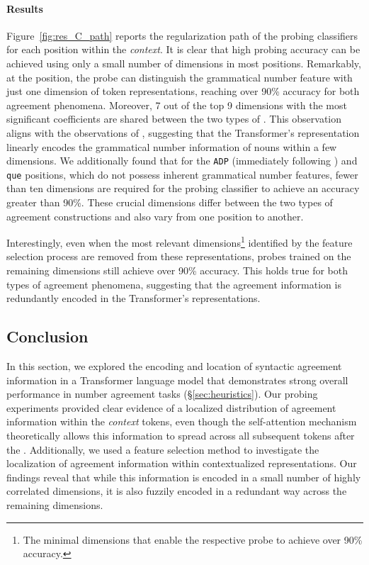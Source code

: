 \paragraph{Results} Figure~\ref{fig:res_C_path} reports the regularization path of the probing classifiers for each position within the \emph{context}. It is clear that high probing accuracy can be achieved using only a small number of dimensions in most positions. Remarkably, at the \cue position, the probe can distinguish the grammatical number feature with just one dimension of token representations, reaching over 90\% accuracy for both agreement phenomena. Moreover, 7 out of the top 9 dimensions with the most significant coefficients are shared between the two types of \cue. This observation aligns with the observations of \citep{amini2023naturalistic}, suggesting that the Transformer's representation linearly encodes the grammatical number information of nouns within a few dimensions. We additionally found that for the \texttt{ADP} (immediately following \cue) and \texttt{que} positions, which do not possess inherent grammatical number features, fewer than ten dimensions are required for the probing classifier to achieve an accuracy greater than 90\%. These crucial dimensions differ between the two types of agreement constructions and also vary from one position to another.

Interestingly, even when the most relevant dimensions\footnote{The minimal dimensions that enable the respective probe to achieve over 90\% accuracy.} identified by the feature selection process are removed from these representations, probes trained on the remaining dimensions still achieve over 90\% accuracy. This holds true for both types of agreement phenomena, suggesting that the agreement information is redundantly encoded in the Transformer's representations.



\subsection{Conclusion}

In this section, we explored the encoding and location of syntactic agreement information in a Transformer language model that demonstrates strong overall performance in number agreement tasks (\S\ref{sec:heuristics}). Our probing experiments provided clear evidence of a localized distribution of agreement information within the \emph{context} tokens, even though
the self-attention mechanism theoretically allows this information to spread across all subsequent tokens after the \cue. Additionally, we used a feature selection method to investigate the localization of agreement information within contextualized representations. Our findings reveal that while this information is encoded in a small number of highly correlated dimensions, it is also fuzzily encoded in a redundant way across the remaining dimensions.

